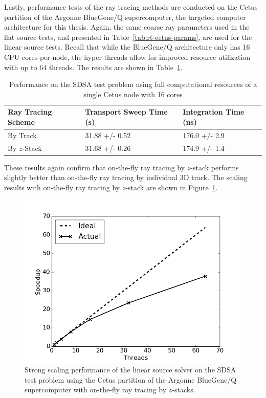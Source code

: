 Lastly, performance tests of the ray tracing methods are conducted on the Cetus partition of the Argonne BlueGene/Q supercomputer, the targeted computer architecture for this thesis. Again, the same coarse ray parameters used in the flat source tests, and presented in Table~\ref{tab:rt-cetus-params}, are used for the linear source tests. Recall that while the BlueGene/Q architecture only has 16 CPU cores per node, the hyper-threads allow for improved resource utilization with up to 64 threads. The results are shown in Table~\ref{tab:rt-full-thread-cetus-ls}.

\begin{table}[ht]
	\centering
	\caption{Performance on the SDSA test problem using full computational resources of a single Cetus node with 16 cores}
	\medskip
	\begin{tabular}{l|l|l}
		\hline
		Ray Tracing Scheme & Transport Sweep Time (s) & Integration Time (ns) \\
		\hline
		By Track & 31.88 +/- 0.52 & 176.0 +/- 2.9 \\
		By $z$-Stack & 31.68 +/- 0.26 & 174.9 +/- 1.4 \\
		\hline
	\end{tabular}
	\label{tab:rt-full-thread-cetus-ls}
\end{table}

These results again confirm that on-the-fly ray tracing by $z$-stack performs slightly better than on-the-fly ray tracing by individual 3D track. The scaling results with on-the-fly ray tracing by $z$-stack are shown in Figure~\ref{fig:rt-parallel-ls-cetus}. 

\begin{figure}[ht!]
	\centering
	\includegraphics[width=0.75\linewidth]{figures/results/performance/ls-parallel-scaling-stacks-cetus.png}
	\caption{Strong scaling performance of the linear source solver on the SDSA test problem using the Cetus partition of the Argonne BlueGene/Q supercomputer with on-the-fly ray tracing by $z$-stacks.}
	\label{fig:rt-parallel-ls-cetus}
\end{figure}

